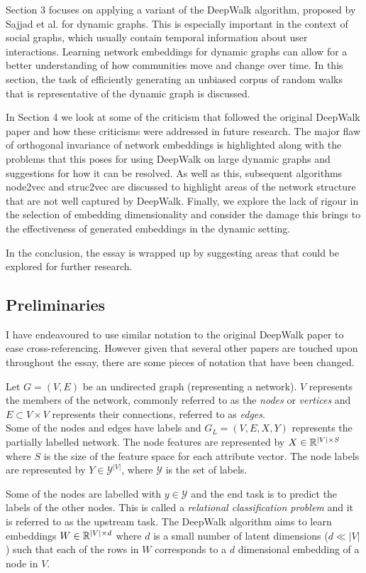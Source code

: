 \documentclass[a4paper]{article}
\begin{document}
Section 3 focuses on applying a variant of the DeepWalk algorithm, proposed
by Sajjad et al. \cite{sajjad2019} for dynamic graphs. This is especially
important in the context of social graphs, which usually contain temporal information
about user interactions. Learning network embeddings for dynamic graphs can allow for a better understanding of how
communities move and change over time. In this section, the task of efficiently generating an unbiased corpus of random walks that is representative of
the dynamic graph is discussed.

In Section 4 we look at some of the criticism that followed the original DeepWalk paper and how these criticisms
were addressed in future research. The major flaw of orthogonal invariance of network embeddings is highlighted along with the problems that this poses for using DeepWalk on large dynamic graphs and suggestions for how it can be resolved.
As well as this, subsequent algorithms node2vec and struc2vec are discussed to highlight areas of the network structure that are not well captured by DeepWalk. Finally, we explore the lack of rigour in the selection of embedding dimensionality and consider the damage this brings to the effectiveness of generated embeddings in the dynamic setting.

In the conclusion, the essay is wrapped up by suggesting areas that could be explored for further research.

\subsection{Preliminaries}
I have endeavoured to use similar notation to the original DeepWalk paper to ease
cross-referencing. However given that several other papers are touched upon
throughout the essay, there are some pieces of notation that have been changed.

\begin{definition}
  Let $G = (V, E)$ be an undirected graph (representing a network). $V$ represents the
  members of the network, commonly referred to as the \textit{nodes} or \textit{vertices} and $E \subset V
  \times V$ represents their connections, referred to as
  \textit{edges}.\\
  Some of the nodes and edges have labels and $G_L = (V, E, X, Y)$ represents the
  partially labelled network. The node features are represented by $X \in \R^{|V| \times S}$ where $S$ is the size of
  the feature space for each attribute vector. The node labels are represented by $Y \in \mathcal{Y}^{|V|}$, where $\mathcal{Y}$ is the set of labels.
\end{definition}
Some of the nodes are labelled with $y \in \mathcal{Y}$ and the end task is to
predict the labels of the other nodes. This is called a \textit{relational classification \cite{deepwalk} problem} and it is referred to as the upstream task. The DeepWalk algorithm aims to learn embeddings $W \in \R^{|V| \times d}$ where $d$ is a small number
of latent dimensions ($d \ll |V|$) such that each of the rows in $W$
corresponds to a $d$ dimensional embedding of a node in $V$.
\end{document}
